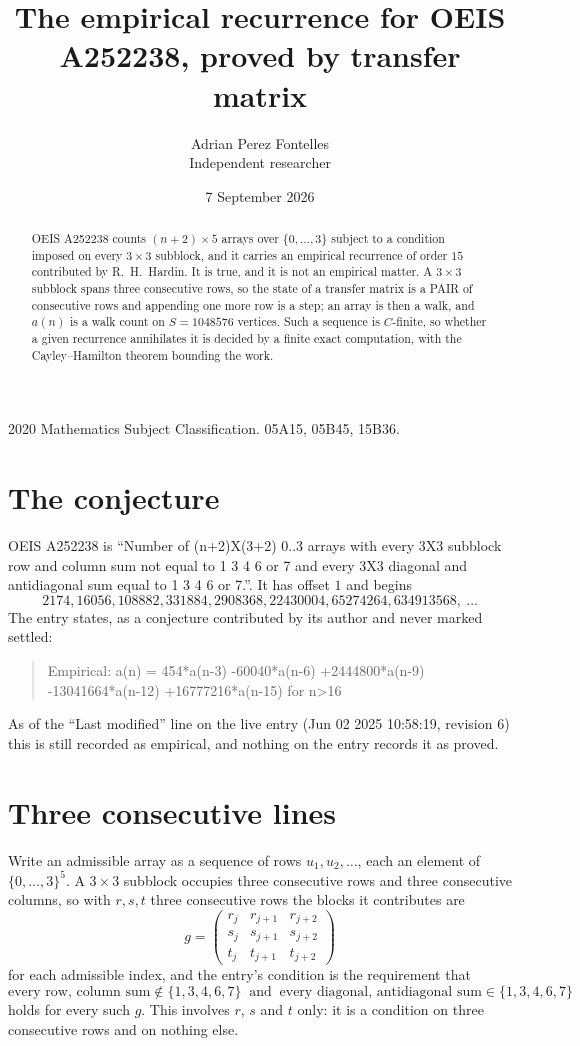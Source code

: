 \documentclass[11pt,a4paper]{article}
\title{The empirical recurrence for OEIS A252238, proved by transfer matrix}
\author{Adrian Perez Fontelles\\ \small Independent researcher}
\date{7 September 2026}
\theoremstyle{plain}
\theoremstyle{definition}
\begin{document}
\maketitle

\begin{abstract}
OEIS A252238 counts $(n+2)\times5$ arrays over $\{0,\dots,3\}$ subject to a condition imposed on
every $3\times3$ subblock, and it carries an empirical recurrence of order $15$
contributed by R.~H.~Hardin. It is true, and it is not an empirical matter. A $3\times3$
subblock spans three consecutive rows, so the state of a transfer matrix is a PAIR of
consecutive rows and appending one more row is a step; an array is then a walk, and
$a(n)$ is a walk count on $S=1048576$ vertices. Such a sequence is $C$-finite, so whether a given
recurrence annihilates it is decided by a finite exact computation, with the Cayley--Hamilton
theorem bounding the work.
\end{abstract}

\noindent\small 2020 Mathematics Subject Classification. 05A15, 05B45, 15B36.\normalsize

\section{The conjecture}

OEIS A252238 is ``Number of (n+2)X(3+2) 0..3 arrays with every 3X3 subblock row and column sum not equal to 1 3 4 6 or 7 and every 3X3 diagonal and antidiagonal sum equal to 1 3 4 6 or 7.''. It has offset $1$ and begins
\[
2174, 16056, 108882, 331884, 2908368, 22430004, 65274264, 634913568,\ \dots
\]
The entry states, as a conjecture contributed by its author and never marked settled:
\begin{quote}
Empirical: a(n) = 454*a(n-3) -60040*a(n-6) +2444800*a(n-9) -13041664*a(n-12) +16777216*a(n-15) for n>16
\end{quote}
As of the ``Last modified'' line on the live entry (Jun 02 2025 10:58:19, revision 6) this is still
recorded as empirical, and nothing on the entry records it as proved.

\section{Three consecutive lines}

Write an admissible array as a sequence of rows $u_1,u_2,\dots$, each an element of
$\{0,\dots,3\}^{5}$. A $3\times3$ subblock occupies three consecutive rows and
three consecutive columns, so with $r,s,t$ three consecutive rows the blocks it
contributes are
\[
g=\begin{pmatrix}r_j&r_{j+1}&r_{j+2}\\ s_j&s_{j+1}&s_{j+2}\\ t_j&t_{j+1}&t_{j+2}\end{pmatrix}
\]
for each admissible index, and the entry's condition is the requirement that
\[
\text{every row, column sum} \notin \{1,3,4,6,7\}\ \text{ and }\ \text{every diagonal, antidiagonal sum} \in \{1,3,4,6,7\}
\]
holds for every such $g$. This involves $r$, $s$ and $t$ only: it is a condition on
three consecutive rows and on nothing else.
\end{document}
